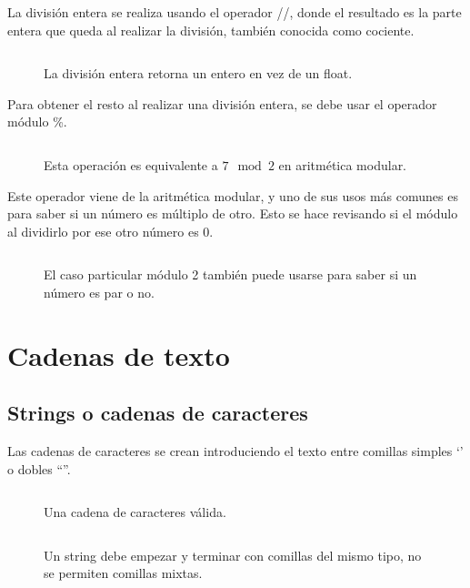 \documentclass{article}
\newcommand{\simple}[1]{`#1'}
\newcommand{\doble}[1]{``#1''}
\begin{document}
La división entera se realiza usando el operador //, donde el resultado es la parte entera que queda al realizar la división, también conocida como cociente.
  
\begin{figure}[ht!]
  \inputminted[frame=single, linenos]{python}{codigo/2-basico/cociente.py}
  \caption{La división entera retorna un entero en vez de un float.}
\end{figure}

Para obtener el resto al realizar una división entera, se debe usar el operador módulo \%.

\begin{figure}[ht!]
  \inputminted[frame=single, linenos]{python}{codigo/2-basico/resto.py}
  \caption{Esta operación es equivalente a $7 \mod{2}$ en aritmética modular.}
\end{figure}

Este operador viene de la aritmética modular, y uno de sus usos más comunes es para saber si un número es múltiplo de otro. Esto se hace revisando si el módulo al dividirlo por ese otro número es 0.

\begin{figure}[ht!]
  \inputminted[frame=single, linenos]{python}{codigo/2-basico/uso_del_resto.py}
  \caption{El caso particular módulo 2 también puede usarse para saber si un número es par o no.}
\end{figure}

\section{Cadenas de texto}

\subsection{Strings o cadenas de caracteres}

Las cadenas de caracteres se crean introduciendo el texto entre comillas simples \simple{} o dobles \doble{}.

\begin{figure}[ht!]
  \inputminted[frame=single, linenos]{python}{codigo/3-strings/string.py}
  \caption{Una cadena de caracteres válida.}
\end{figure}

\begin{figure}[ht!]
  \inputminted[frame=single, linenos]{python}{codigo/3-strings/strings_no_validos.py}
  \caption{Un string debe empezar y terminar con comillas del mismo tipo, no se permiten comillas mixtas.}
\end{figure}
\end{document}
